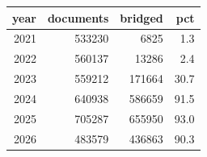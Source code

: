 \begin{table}[htbp]
\centering
\label{tab:bridge_coverage}
\begin{tabular}{rrrr}
\toprule
year & documents & bridged & pct \\
\midrule
2021 & 533230 & 6825 & 1.3 \\
2022 & 560137 & 13286 & 2.4 \\
2023 & 559212 & 171664 & 30.7 \\
2024 & 640938 & 586659 & 91.5 \\
2025 & 705287 & 655950 & 93.0 \\
2026 & 483579 & 436863 & 90.3 \\
\bottomrule
\end{tabular}
\end{table}
